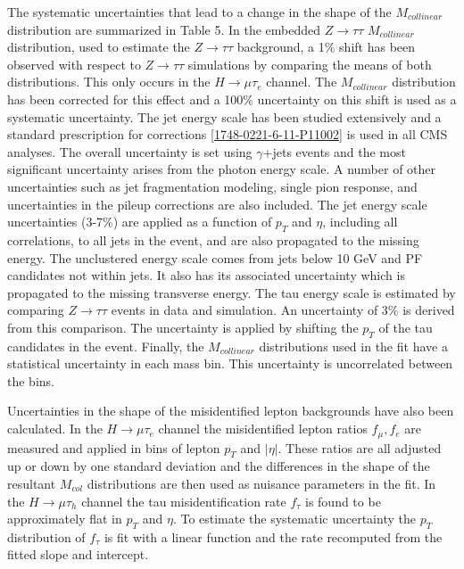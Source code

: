 \documentclass[oneside, letterpaper, oldfontcommands]{memoir}
\begin{document}
\qquad The systematic uncertainties that lead to a change in the shape of the $M_{collinear}$ distribution are summarized in Table 5. In the embedded $Z \rightarrow \tau\tau$ $M_{collinear}$ distribution, used to estimate the $Z \rightarrow \tau\tau$ background, a 1\% shift has been observed with respect to $Z \rightarrow \tau\tau$ simulations by comparing the means of both distributions. This only occurs in the $H \rightarrow \mu\tau_{e}$ channel. The $M_{collinear}$ distribution has been corrected for this effect and a 100\% uncertainty on this shift is used as a systematic uncertainty. The jet energy scale has been studied extensively and a standard prescription for corrections \ref{1748-0221-6-11-P11002} is used in all CMS analyses. The overall uncertainty is set using $\gamma$+jets events and the most significant uncertainty arises from the photon energy scale. A number of other uncertainties such as jet fragmentation modeling, single pion response, and uncertainties in the pileup corrections are also included. The jet energy scale uncertainties (3-7\%) are applied as a function of $p_{T}$ and $\eta$, including all correlations, to all jets in the event, and are also propagated to the missing energy. The unclustered energy scale comes from jets below 10 GeV and PF candidates not within jets. It also has its associated uncertainty which is propagated to the missing transverse energy. The tau energy scale is estimated by comparing $Z \rightarrow \tau\tau$ events in data and simulation. An uncertainty of 3\% is derived from this comparison. The uncertainty is applied by shifting the $p_{T}$ of the tau candidates in the event. Finally, the $M_{collinear}$ distributions used in the fit have a statistical uncertainty in each mass bin. This uncertainty is uncorrelated between the bins.

\qquad Uncertainties in the shape of the misidentified lepton backgrounds have also been calculated. In the $H \rightarrow \mu\tau_{e}$ channel the misidentified lepton ratios $f_{\mu},f_{e}$ are measured and applied in bins of lepton $p_{T}$ and $|\eta|$. These ratios are all adjusted up or down by one standard deviation and the differences in the shape of the resultant $M_{col}$ distributions are then used as nuisance parameters in the fit. In the $H \rightarrow \mu\tau_{h}$ channel the tau misidentification rate $f_{\tau}$ is found to be approximately flat in $p_{T}$ and $\eta$. To estimate the systematic uncertainty the $p_{T}$ distribution of $f_{\tau}$ is fit with a linear function and the rate recomputed from the fitted slope and intercept. 
\end{document}
